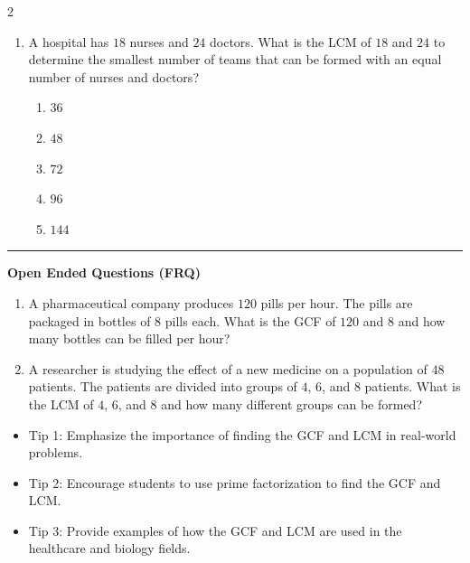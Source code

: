 \documentclass[10pt]{article}
\begin{document}
\begin{multicols}{2}
\begin{enumerate}[label=\textbf{Q\arabic*.}, leftmargin=*, itemsep=6pt, parsep=0pt]
  \item \small A hospital has $18$ nurses and $24$ doctors. What is the LCM of $18$ and $24$ to determine the smallest number of teams that can be formed with an equal number of nurses and doctors?
  \begin{enumerate}[label=(\Alph*), leftmargin=0.6cm, nosep, itemsep=2pt]
    \item $36$
    \item $48$
    \item $72$
    \item $96$
    \item $144$
  \end{enumerate}

\end{enumerate}
\end{multicols}

\vspace{-0.2cm}
\hrule
\vspace{0.2cm}
\textbf{\small Open Ended Questions (FRQ)}
\begin{enumerate}[label=\textbf{Q\arabic*.}, start=9, itemsep=5pt, topsep=0pt]

  \item \small A pharmaceutical company produces $120$ pills per hour. The pills are packaged in bottles of $8$ pills each. What is the GCF of $120$ and $8$ and how many bottles can be filled per hour? \vspace{2cm}

  \item \small A researcher is studying the effect of a new medicine on a population of $48$ patients. The patients are divided into groups of $4$, $6$, and $8$ patients. What is the LCM of $4$, $6$, and $8$ and how many different groups can be formed? \vspace{2cm}

\end{enumerate}

\vfill

\begin{tcolorbox}[colback=blue!5, colframe=mainblue!50, title=\small \textbf{Chef's Tips}, fonttitle=\bfseries, bottom=1mm]
\begin{itemize}[noitemsep, topsep=2pt, leftmargin=0.5cm]
  \item \scriptsize Tip 1: Emphasize the importance of finding the GCF and LCM in real-world problems.\item \scriptsize Tip 2: Encourage students to use prime factorization to find the GCF and LCM.\item \scriptsize Tip 3: Provide examples of how the GCF and LCM are used in the healthcare and biology fields.
\end{itemize}
\end{tcolorbox}
\end{document}

